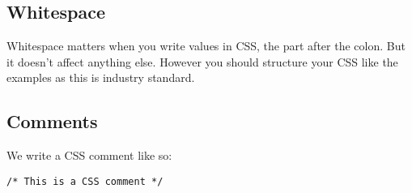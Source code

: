 \subsection{Whitespace}

Whitespace matters when you write values in CSS, the part after the colon. But it doesn't affect anything else. However you should structure your CSS like the examples as this is industry standard.

\subsection{Comments}

We write a CSS comment like so:

\begin{verbatim}
/* This is a CSS comment */
\end{verbatim}

